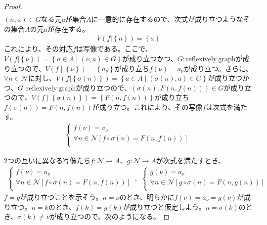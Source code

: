 \documentclass[dvipdfmx]{jsarticle}
\begin{document}
\begin{proof}
\begin{align*}
\end{align*}
$(n,a) \in G$なる元$a$が集合$A$に一意的に存在するので、次式が成り立つようなその集合$A$の元$a$が存在する。
\begin{align*}
V\left( f|\left\{ n \right\} \right) = \left\{ a \right\}
\end{align*}
これにより、その対応$f$は写像である。ここで、$V\left( f|\left\{ \nu \right\} \right) = \left\{ a \in A \middle| (\nu,a) \in G \right\}$が成り立つかつ、$G:\mathrm{reflexively\ graph}$が成り立つので、$V\left( f \middle| \left\{ \nu \right\} \right) = \left\{ a_{\nu} \right\}$が成り立ち$f(\nu) = a_{\nu}$が成り立つ。さらに、$\forall n \in \mathcal{N}$に対し、$V\left( f|\left\{ \sigma(n) \right\} \right) = \left\{ a \in A \middle| \left( \sigma(n),a \right) \in G \right\}$が成り立つかつ、$G:\mathrm{reflexively\ graph}$が成り立つので、$\left( \sigma(n),F\left( n,f(n) \right) \right) \in G$が成り立つので、$V\left( f \middle| \left\{ \sigma(n) \right\} \right) = \left\{ F\left( n,f(n) \right) \right\}$が成り立ち$f\left( \sigma(n) \right) = F\left( n,f(n) \right)$が成り立つ。これにより、その写像$f$は次式を満たす。
\begin{align*}
\left\{ \begin{matrix}
f(\nu) = a_{\nu} \\
\forall n \in \mathcal{N}\left[ f \circ \sigma(n) = F\left( n,f(n) \right) \right] \\
\end{matrix} \right.\ 
\end{align*}\par
2つの互いに異なる写像たち$f:\mathcal{N \rightarrow}A$、$g:\mathcal{N \rightarrow}A$が次式を満たすとき、
\begin{align*}
\left\{ \begin{matrix}
f(\nu) = a_{\nu} \\
\forall n \in \mathcal{N}\left[ f \circ \sigma(n) = F\left( n,f(n) \right) \right] \\
\end{matrix} \right.\ ,\ \ \left\{ \begin{matrix}
g(\nu) = a_{\nu} \\
\forall n \in \mathcal{N}\left[ g \circ \sigma(n) = F\left( n,g(n) \right) \right] \\
\end{matrix} \right.\ 
\end{align*}
$f = g$が成り立つことを示そう。$n = \nu$のとき、明らかに$f(\nu) = a_{\nu} = g(\nu)$が成り立つ。$n = k$のとき、$f(k) = g(k)$が成り立つと仮定しよう。$n = \sigma(k)$のとき、$\sigma(k) \neq \nu$が成り立つので、次のようになる。

\end{proof}
\end{document}
